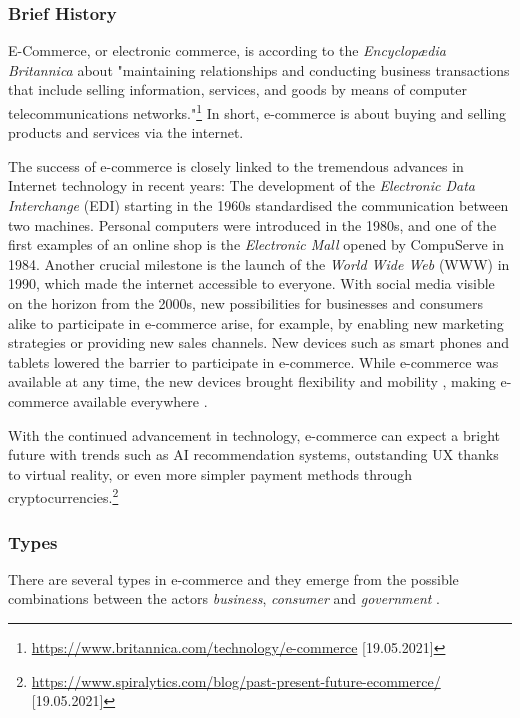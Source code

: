 \subsubsection{Brief History}

E-Commerce, or electronic commerce, is according to the \textit{Encyclopædia Britannica} about "maintaining relationships and conducting business transactions that include selling information, services, and goods by means of computer telecommunications networks."\footnote{\url{https://www.britannica.com/technology/e-commerce} [19.05.2021]}
In short, e-commerce is about buying and selling products and services via the internet.


The success of e-commerce is closely linked to the tremendous advances in Internet technology in recent years:
The development of the \textit{Electronic Data Interchange} (EDI) starting in the 1960s standardised the communication between two machines.
Personal computers were introduced in the 1980s, and one of the first examples of an online shop is the \textit{Electronic Mall} opened by CompuServe in 1984.
Another crucial milestone is the launch of the \textit{World Wide Web} (WWW) in 1990, which made the internet accessible to everyone.
With social media visible on the horizon from the 2000s, new possibilities for businesses and consumers alike to participate in e-commerce arise, for example, by enabling new marketing strategies or providing new sales channels.
New devices such as smart phones and tablets lowered the barrier to participate in e-commerce.
While e-commerce was available at any time, the new devices brought flexibility and mobility , making e-commerce available everywhere \cite{2019Hermogeno}.

With the continued advancement in technology, e-commerce can expect a bright future with trends such as AI recommendation systems, outstanding UX thanks to virtual reality, or even more simpler payment methods through cryptocurrencies.\footnote{\url{https://www.spiralytics.com/blog/past-present-future-ecommerce/} [19.05.2021]}



\subsubsection{Types}

There are several types in e-commerce and they emerge from the possible combinations between the actors \textit{business}, \textit{consumer} and \textit{government} \cite{2017DosSantos}.

